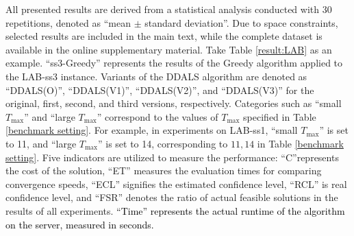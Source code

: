 \documentclass[lettersize,journal]{IEEEtran}
\begin{document}
All presented results are derived from a statistical analysis conducted with 30 repetitions, denoted as ``mean $\pm$ standard deviation''. 
Due to space constraints, selected results are included in the main text, while the complete dataset is available in the online supplementary material.
Take Table \ref{result:LAB} as an example. 
``ss3-Greedy'' represents the results of the Greedy algorithm applied to the LAB-ss3 instance. 
Variants of the DDALS algorithm are denoted as ``DDALS(O)'', ``DDALS(V1)'', ``DDALS(V2)'', and ``DDALS(V3)'' for the original, first, second, and third versions, respectively. 
Categories such as ``small $T_{\max}$'' and ``large $T_{\max}$'' correspond to the values of $T_{\max}$ specified in Table \ref{benchmark setting}. 
For example, in experiments on LAB-ss1, ``small $T_{\max}$'' is set to 11, and ``large $T_{\max}$'' is set to 14, corresponding to ${11,14}$ in Table \ref{benchmark setting}.
Five indicators are utilized to measure the performance: ``C''represents the cost of the solution, ``ET'' measures the evaluation times for comparing convergence speeds, ``ECL'' signifies the estimated confidence level, ``RCL'' is real confidence level, and ``FSR'' denotes the ratio of actual feasible solutions in the results of all experiments. 
\textcolor{black}{``Time'' represents the actual runtime of the algorithm on the server, measured in seconds.}
\end{document}
